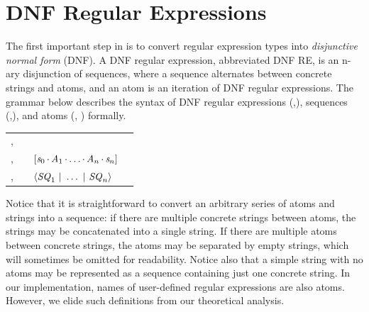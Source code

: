 \documentclass[acmsmall]{acmart}
\begin{document}

\section{DNF Regular Expressions}
\label{sec:dnfre}


The first important step in \Optician{} is to convert
regular expression types into \emph{disjunctive normal form} (DNF).
A DNF regular expression, abbreviated DNF RE, is an n-ary disjunction of
sequences, where a sequence alternates between concrete strings and
atoms, and an atom is an iteration of DNF regular expressions.
The grammar below describes the syntax of 
DNF regular expressions (\DNFRegex{},\DNFRegexAlt{}),
sequences (\Sequence{},\SequenceAlt{}), and atoms (\Atom, \AtomAlt)
formally.

\begin{center}
  \begin{tabular}{l@{\ }c@{\ }l@{\ }>{\itshape\/}r}
    \Atom{},\AtomAlt{} & \GEq{} & \StarOf{\DNFRegex{}}
\\
    \Sequence{},\SequenceAlt{} & \GEq{} &
                                                       $[\mathit{s}_0\mkern-1mu\cdot\mkern-1mu\mathit{A}_1\mkern-1mu\cdot\mkern-1mu\ldots\mkern-1mu\cdot\mkern-1mu\mathit{A}_n\mkern-1mu\cdot\mkern-1mu\mathit{s}_n]$ 
\\
    \DNFRegex{},\DNFRegexAlt{} & \GEq{} & $\langle\mathit{SQ}_1~|~\ldots~|~\mathit{SQ}_n\rangle$ %
  \end{tabular}
\end{center}


Notice that it is straightforward to convert an arbitrary series
of atoms and strings into a sequence:  if there are multiple concrete strings 
between atoms, the strings may be concatenated into a single string.
If there are multiple atoms between concrete strings, the atoms 
may be separated by empty strings, which will sometimes be omitted for
readability.
Notice also that a simple string with no atoms may be represented as
a sequence containing just one concrete string.
In our implementation, names of user-defined regular expressions
are also atoms.  However, we elide such definitions from our theoretical analysis.
\end{document}
